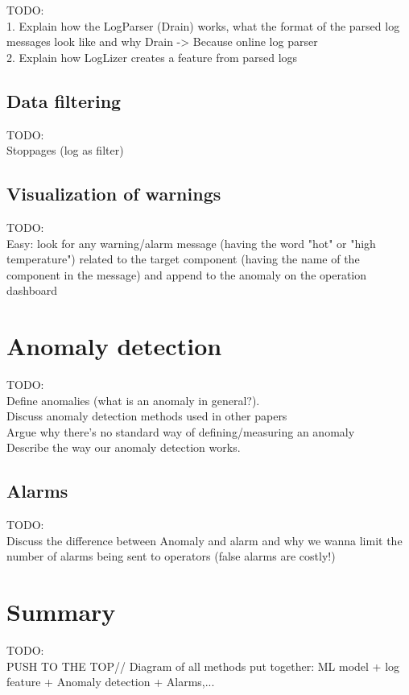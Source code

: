     TODO:\\
    1. Explain how the LogParser (Drain) works, what the format of the parsed log messages look like and why Drain -> Because online log parser\\
    2. Explain how LogLizer creates a feature from parsed logs

\subsection{Data filtering}
  TODO:\\
  Stoppages (log as filter)

\subsection{Visualization of warnings}
  TODO:\\
  Easy: look for any warning/alarm message (having the word "hot" or "high temperature") related to the target component (having the name of the component in the message) 
  and append to the anomaly on the operation dashboard

\section{Anomaly detection}
  TODO:\\
  Define anomalies (what is an anomaly in general?).\\
  Discuss anomaly detection methods used in other papers\\
  Argue why there's no standard way of defining/measuring an anomaly\\
  Describe the way our anomaly detection works.

\subsection{Alarms}
  TODO:\\
  Discuss the difference between Anomaly and alarm and why we wanna limit the number of alarms being sent to operators (false alarms are costly!)

\section{Summary}
TODO:\\
PUSH TO THE TOP//
Diagram of all methods put together: ML model + log feature + Anomaly detection + Alarms,...